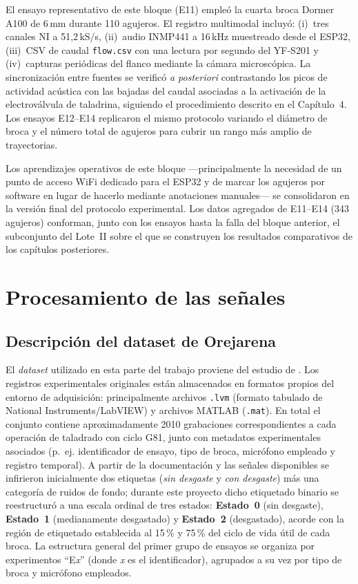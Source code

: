 \documentclass[12pt, letterpaper]{report}
\begin{document}
El ensayo representativo de este bloque (E11) empleó la cuarta broca Dormer A100 de 6\,mm durante 110 agujeros. El registro multimodal incluyó: (i)~tres canales NI a 51{,}2\,kS/s, (ii)~audio INMP441 a 16\,kHz muestreado desde el ESP32, (iii)~CSV de caudal \texttt{flow.csv} con una lectura por segundo del YF-S201 y (iv)~capturas periódicas del flanco mediante la cámara microscópica. La sincronización entre fuentes se verificó \emph{a posteriori} contrastando los picos de actividad acústica con las bajadas del caudal asociadas a la activación de la electroválvula de taladrina, siguiendo el procedimiento descrito en el Capítulo~4. Los ensayos E12--E14 replicaron el mismo protocolo variando el diámetro de broca y el número total de agujeros para cubrir un rango más amplio de trayectorias.

Los aprendizajes operativos de este bloque ---principalmente la necesidad de un punto de acceso WiFi dedicado para el ESP32 y de marcar los agujeros por software en lugar de hacerlo mediante anotaciones manuales--- se consolidaron en la versión final del protocolo experimental. Los datos agregados de E11--E14 (343 agujeros) conforman, junto con los ensayos hasta la falla del bloque anterior, el subconjunto del Lote~II sobre el que se construyen los resultados comparativos de los capítulos posteriores.

\clearpage
\chapter{Procesamiento de las señales}

\section{Descripción del dataset de Orejarena}

El \textit{dataset} utilizado en esta parte del trabajo proviene del estudio de . Los registros experimentales originales están almacenados en formatos propios del entorno de adquisición: principalmente archivos \texttt{.lvm} (formato tabulado de National Instruments/LabVIEW) y archivos MATLAB (\texttt{.mat}). En total el conjunto contiene aproximadamente 2010 grabaciones correspondientes a cada operación de taladrado con ciclo G81, junto con metadatos experimentales asociados (p.~ej. identificador de ensayo, tipo de broca, micrófono empleado y registro temporal). A partir de la documentación y las señales disponibles se infirieron inicialmente dos etiquetas (\emph{sin desgaste} y \emph{con desgaste}) más una categoría de ruidos de fondo; durante este proyecto dicho etiquetado binario se reestructuró a una escala ordinal de tres estados: \textbf{Estado~0} (sin desgaste), \textbf{Estado~1} (medianamente desgastado) y \textbf{Estado~2} (desgastado), acorde con la región de etiquetado establecida al 15\,\% y 75\,\% del ciclo de vida útil de cada broca. La estructura general del primer grupo de ensayos se organiza por experimentos ``E\textit{x}'' (donde \textit{x} es el identificador), agrupados a su vez por tipo de broca y micrófono empleados.
\end{document}
